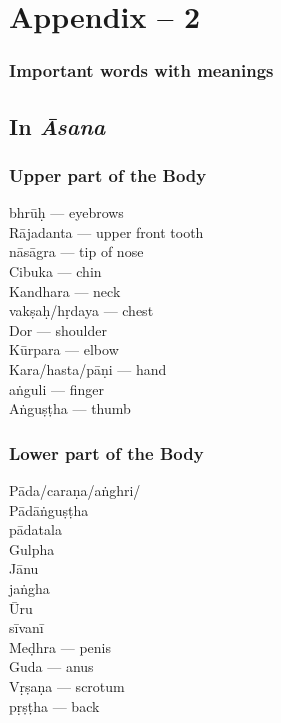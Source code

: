 \chapter{Appendix – 2}

\subsection*{Important words with meanings}

\section*{In \textit{Āsana}}

\subsection*{Upper part of the Body}

\begin{multicols}{2}
bhrūḥ --- eyebrows\\
Rājadanta --- upper front tooth\\
nāsāgra --- tip of nose\\
Cibuka --- chin\\
Kandhara --- neck \\
vakṣaḥ/hṛdaya --- chest \\
Dor --- shoulder\\
Kūrpara --- elbow\\ 
Kara/hasta/pāṇi --- hand\\
aṅguli --- finger\\
Aṅguṣṭha --- thumb
\end{multicols}

\subsection*{Lower part of the Body}

\begin{multicols}{2}
Pāda/caraṇa/aṅghri/ \\
Pādāṅguṣṭha \\
pādatala \\
Gulpha \\
Jānu \\
jaṅgha \\
Ūru \\
sīvanī \\
Meḍhra --- penis\\
Guda --- anus  \\
Vṛṣaṇa --- scrotum\\
pṛṣṭha --- back
\end{multicols}

